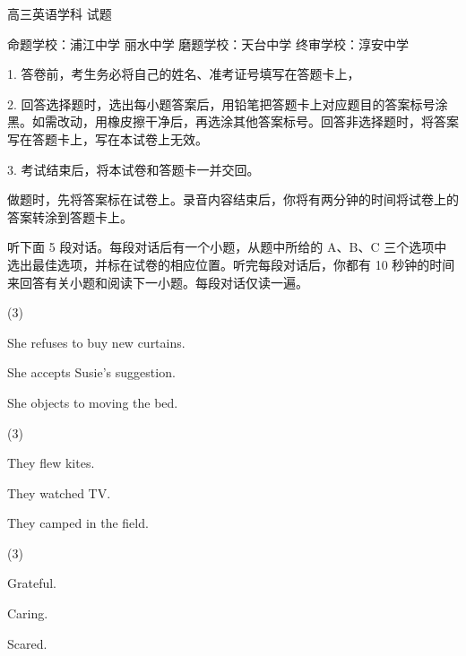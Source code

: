 \documentclass{英语试卷}
\begin{document}
\par 高三英语学科 试题\par
\par 命题学校：浦江中学 丽水中学 磨题学校：天台中学 终审学校：淳安中学\par
\begin{notice}
\par 1. 答卷前，考生务必将自己的姓名、准考证号填写在答题卡上，\par
\par 2. 回答选择题时，选出每小题答案后，用铅笔把答题卡上对应题目的答案标号涂黑。如需改动，用橡皮擦干净后，再选涂其他答案标号。回答非选择题时，将答案写在答题卡上，写在本试卷上无效。\par
\par 3. 考试结束后，将本试卷和答题卡一并交回。\par
\end{notice}
\par 做题时，先将答案标在试卷上。录音内容结束后，你将有两分钟的时间将试卷上的答案转涂到答题卡上。\par
{}
\par 听下面 5 段对话。每段对话后有一个小题，从题中所给的 A、B、C 三个选项中选出最佳选项，并标在试卷的相应位置。听完每段对话后，你都有 10 秒钟的时间来回答有关小题和阅读下一小题。每段对话仅读一遍。\par
{}
\begin{choices}(3)
  \item She refuses to buy new curtains.
  \item She accepts Susie's suggestion.
  \item She objects to moving the bed.
\end{choices}
\begin{choices}(3)
  \item They flew kites.
  \item They watched TV.
  \item They camped in the field.
\end{choices}
\begin{choices}(3)
  \item Grateful.
  \item Caring.
  \item Scared.
\end{choices}
\end{document}
